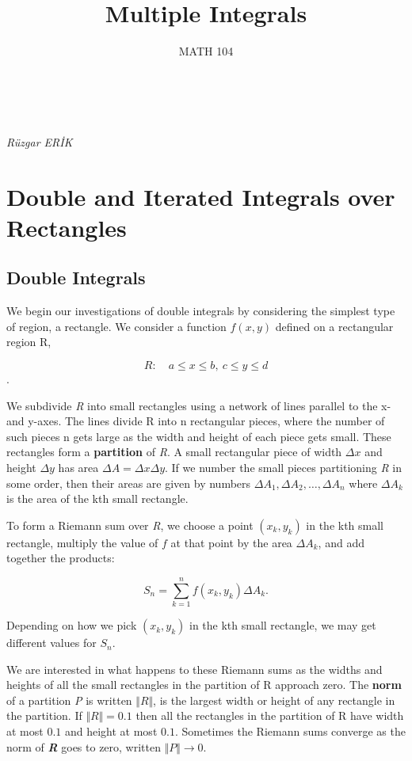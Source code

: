 \documentclass[12pt,a4paper,draft]{article}
\makeatletter
\renewcommand{\maketitle}{%
  \thispagestyle{firstpage} %
  \begin{tcolorbox}[colback=white,colframe=black,width=\textwidth,arc=0mm,auto outer arc]
    \begin{center}
      \Large \@title \\[1ex] \large \@date \\ \textit{Rüzgar ERİK}
    \end{center}
  \end{tcolorbox}
}
\makeatother
\begin{document}
\title{Multiple Integrals}
\date{MATH 104}
\maketitle
\tableofcontents %

\newpage %

\section{Double and Iterated Integrals over Rectangles}

\subsection{Double Integrals}

We begin our investigations of double integrals by considering the simplest type of region, a rectangle. We consider a function \(f(x,y)\) defined on a rectangular region R,

\[R: \quad a \leq x \leq b, \ c \leq y \leq d\].

We subdivide \textit{R} into small rectangles using a network of lines parallel to the x- and y-axes.
The lines divide R into n rectangular pieces, where the number of such pieces n gets large as the width and height of each piece gets small. These rectangles form a \textbf{partition} of \textit{R}. 
A small rectangular piece of width \(\Delta x\) and height \(\Delta y\) has area \(\Delta A = \Delta x \Delta y\). If we number the small pieces partitioning \textit{R} in some order, then their areas are given by numbers \(\Delta A_1, \Delta A_2 , \dots , \Delta A_n\) where \(\Delta A_k\) is the area of the kth small rectangle.


To form a Riemann sum over \textit{R}, we choose a point \((x_k,y_k)\) in the kth small rectangle, multiply the value of \(f\) at that point by the area \(\Delta A_k\), and add together the products:

\[S_n = \sum_{k=1}^{n}f(x_k,y_k)\Delta A_k.\]

Depending on how we pick \((x_k,y_k)\) in the kth small rectangle, we may get different values for \(S_n\).


We are interested in what happens to these Riemann sums as the widths and heights of all the small rectangles in the partition of R approach zero. The \textbf{norm} of  a partition \textit{P} is written \(\Vert R \Vert\), is the largest width or height of any rectangle in the partition.
If \(\Vert R \Vert = 0.1\) then all the rectangles in the partition of R have width at most \(0.1\) and height at most \(0.1\).  Sometimes the Riemann sums converge as the norm of \textit{\textbf{R}} goes to zero, written \(\Vert P \Vert  \to 0\). 
\end{document}
